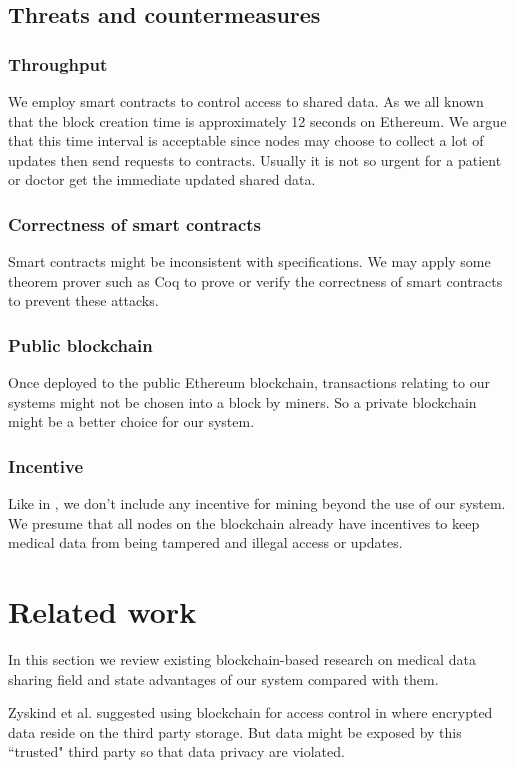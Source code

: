 \documentclass[conference]{IEEEtran}
\begin{document}
\subsection{Threats and countermeasures}
\subsubsection{Throughput}
We employ smart contracts to control access to shared data. As we all known that the block creation time is approximately 12 seconds on Ethereum. We argue that this time interval is acceptable since nodes may choose to collect a lot of updates then send requests to contracts. Usually it is not so urgent for a patient or doctor get the immediate updated shared data.

\subsubsection{Correctness of smart contracts }
Smart contracts might be inconsistent with specifications. We may apply some theorem prover such as Coq\cite{huet2004coq} to prove or verify the correctness of smart contracts to prevent these attacks.

\subsubsection{Public blockchain}
Once deployed to the public Ethereum blockchain, transactions relating to our systems might not be chosen into a block by miners. So a private blockchain might be a better choice for our system.

\subsubsection{Incentive}
Like in \cite{dagher2018ancile}, we don't include any incentive for mining beyond the use of our system. We presume that all nodes on the blockchain already have incentives to keep medical data from being tampered and illegal access or updates.

\section{Related work}
\label{related work}
In this section we review existing blockchain-based research on medical data sharing field and state advantages of our system compared with them.

Zyskind et al. suggested using blockchain for access control in \cite{zyskind2015decentralizing} where encrypted data reside on the third party storage. But data might be exposed by this ``trusted" third party so that data privacy are violated.
\end{document}
